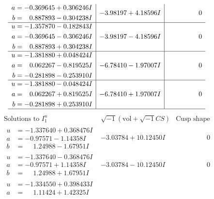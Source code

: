 \documentclass[1p]{elsarticle_modified}
\theoremstyle{definition}
\newcommand{\I}{\sqrt{-1}}
\begin{document}
$$\begin{array}{c|c|c}
\begin{aligned}
a &= -0.369645 + 0.306246 I \\
b &= \phantom{-}0.887893 - 0.304238 I\end{aligned}
 & -3.98197 + 4.18596 I & \phantom{-0.000000 } 0 \\ \hline\begin{aligned}
u &= -1.357870 - 0.182843 I \\
a &= -0.369645 - 0.306246 I \\
b &= \phantom{-}0.887893 + 0.304238 I\end{aligned}
 & -3.98197 - 4.18596 I & \phantom{-0.000000 } 0 \\ \hline\begin{aligned}
u &= -1.381880 + 0.048424 I \\
a &= \phantom{-}0.062267 - 0.819525 I \\
b &= -0.281898 - 0.253910 I\end{aligned}
 & -6.78410 - 1.97007 I & \phantom{-0.000000 } 0 \\ \hline\begin{aligned}
u &= -1.381880 - 0.048424 I \\
a &= \phantom{-}0.062267 + 0.819525 I \\
b &= -0.281898 + 0.253910 I\end{aligned}
 & -6.78410 + 1.97007 I & \phantom{-0.000000 } 0\\
 \hline 
 \end{array}$$\newpage$$\begin{array}{c|c|c}  
\text{Solutions to }I^u_{1}& \I (\text{vol} + \sqrt{-1}CS) & \text{Cusp shape}\\
 \hline 
\begin{aligned}
u &= -1.337640 + 0.368476 I \\
a &= -0.97571 - 1.14358 I \\
b &= \phantom{-}1.24988 - 1.67951 I\end{aligned}
 & -3.03784 + 10.12450 I & \phantom{-0.000000 } 0 \\ \hline\begin{aligned}
u &= -1.337640 - 0.368476 I \\
a &= -0.97571 + 1.14358 I \\
b &= \phantom{-}1.24988 + 1.67951 I\end{aligned}
 & -3.03784 - 10.12450 I & \phantom{-0.000000 } 0 \\ \hline\begin{aligned}
u &= -1.334550 + 0.398433 I \\
a &= \phantom{-}1.11424 + 1.42325 I \\

\end{aligned}
\end{array}$$
\end{document}
